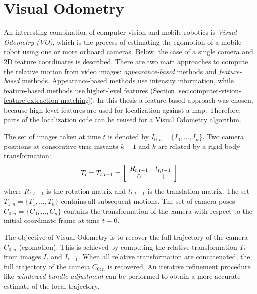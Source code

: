 \section{Visual Odometry}
\label{sec:background-visual-odometry}
An interesting combination of computer vision and mobile robotics is \textit{Visual Odometry (VO)}, which is the process of estimating the egomotion of a mobile robot using one or more onboard cameras.
Below,
the case of a single camera and 2D feature coordinates is described.
There are two main approaches to compute the relative motion from video images: \textit{appearance-based} methods and \textit{feature-based} methods.
Appearance-based methods use intensity information, while feature-based methods use higher-level features (Section \ref{sec:computer-vision-feature-extraction-matching}).
In this thesis a feature-based approach was chosen, because high-level features are used for localization against a map.
Therefore, parts of the localization code can be reused for a Visual Odometry algorithm.

The set of images taken at time $t$ is denoted by $I_{0:n} = \{I_0, \hdots, I_n\}$.
Two camera positions at consecutive time instants $k-1$ and $k$ are related by a rigid body transformation:
\begin{equation}
\label{eq:computer-vision-visual-odometry-T}
T_t = T_{t,t-1} = 
\left[ \begin{array}{c c}
R_{t,t-1} & t_{t,t-1} \\
0 & 1
\end{array} \right]
\end{equation}
where $R_{t,t-1}$ is the rotation matrix and $t_{t,t-1}$ is the translation matrix.
The set $T_{1:n} = \{T_1, \hdots, T_n\}$ contains all subsequent motions.
The set of camera poses $C_{0:n} = \{C_0, \hdots, C_n\}$ contains the transformation of the camera with respect to the initial coordinate frame at time $t = 0$.

The objective of Visual Odometry is to recover the full trajectory of the camera $C_{0:n}$ (egomotion).
This is achieved by computing the relative transformation $T_t$ from images $I_t$ and $I_{t-1}$.
When all relative transformation are concatenated, the full trajectory of the camera $C_{0:n}$ is recovered.
An iterative refinement procedure like \textit{windowed-bundle adjustment} can be performed to obtain a more accurate estimate of the local trajectory.

